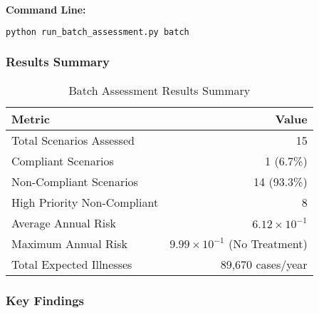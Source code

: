 \documentclass[11pt,a4paper]{article}
\begin{document}
\textbf{Command Line:}
\begin{lstlisting}[style=bashstyle, language=bash]
python run_batch_assessment.py batch
\end{lstlisting}

\subsubsection{Results Summary}

\begin{table}[H]
\centering
\caption{Batch Assessment Results Summary}
\begin{tabular}{lr}
\toprule
\textbf{Metric} & \textbf{Value} \\
\midrule
Total Scenarios Assessed & 15 \\
Compliant Scenarios & 1 (6.7\%) \\
Non-Compliant Scenarios & 14 (93.3\%) \\
High Priority Non-Compliant & 8 \\
Average Annual Risk & $6.12 \times 10^{-1}$ \\
Maximum Annual Risk & $9.99 \times 10^{-1}$ (No Treatment) \\
Total Expected Illnesses & 89,670 cases/year \\
\bottomrule
\end{tabular}
\end{table}

\subsubsection{Key Findings}
\end{document}
